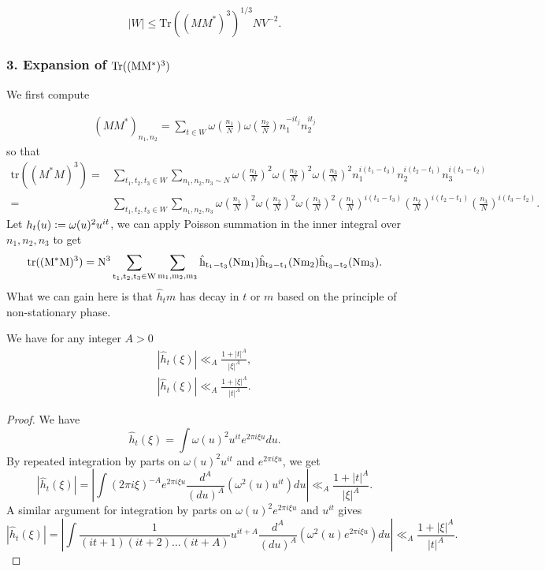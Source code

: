 \begin{equation}
    \label{traceineq}
    |W|\leq \textrm{Tr}((MM^*)^3)^{1/3} NV^{-2}.
\end{equation}

\subsubsection*{3. Expansion of $\rm{Tr}((MM^*)^3)$}
We first compute 

\begin{align*}
    (MM^*)_{n_1,n_2} = \sum_{t\in W} \omega\left(\frac{n_1}{N}\right)\omega\left(\frac{n_2}{N}\right)
    n_1^{-it_j}n_2^{it_j}
\end{align*}
so that\begin{align*}
    \textrm{tr}((M^*M)^3)=& \sum_{t_1,t_2,t_3\in W}\sum_{n_1,n_2,n_3\sim N} 
    \omega\left(\frac{n_1}{N}\right)^2\omega\left(\frac{n_2}{N}\right)^2\omega\left(\frac{n_3}{N}\right)^2 n_1^{i(t_1-t_3)}
   n_2^{i(t_2-t_1)}
    n_3^{i(t_3-t_2)}\\=& \sum_{t_1,t_2,t_3\in W}\sum_{n_1,n_2,n_3} 
    \omega\left(\frac{n_1}{N}\right)^2\omega\left(\frac{n_2}{N}\right)^2\omega\left(\frac{n_3}{N}\right)^2 \left(\frac{n_1}{N}\right)^{i(t_1-t_3)}
    \left(\frac{n_2}{N}\right)^{i(t_2-t_1)}
    \left(\frac{n_3}{N}\right)^{i(t_3-t_2)}.
\end{align*}
Let $h_t(u)\mathrel{\mathop:}= \omega(u)^2 u^{it}$, we can apply Poisson summation in the inner integral over $n_1,n_2,n_3$ to get 
\begin{equation}\label{poissongm}
    \rm{tr}((M^*M)^3)= N^3\sum_{t_1,t_2,t_3\in W}\sum_{m_1,m_2,m_3}  \hat{h}_{t_1-t_3}(Nm_1)\hat{h}_{t_2-t_1}(Nm_2)\hat{h}_{t_3-t_2}(Nm_3).
\end{equation}
What we can gain here is that $\hat{h}_t{m}$ has decay in $t$ or $m$ based on the principle of non-stationary phase. 
\begin{lemma}
    We have for any integer $A>0$\begin{align*}
        |\hat{h}_t(\xi)|\ll_A \frac{1+|t|^A}{|\xi|^A},\\
        |\hat{h}_t(\xi)|\ll_A \frac{1+|\xi|^A}{|t|^A}. 
    \end{align*}
\end{lemma}
\begin{proof}
   We have \[
   \hat{h}_t(\xi)=\int \omega(u)^2u^{it}e^{2\pi i \xi u} du.\]
   By repeated integration by parts on $\omega(u)^2u^{it}$ and $e^{2\pi i \xi u}$, we get \[
    |\hat{h}_t(\xi)|=\left|\int (2\pi i \xi)^{-A} e^{2\pi i \xi u}  \frac{d^A}{(du)^A}\left(\omega^2(u)u^{it}\right) du\right| \ll_A \frac{1+|t|^A}{|\xi|^A}.
   \]
   A similar argument for integration by parts on $\omega(u)^2e^{2\pi i \xi u}$ and $u^{it}$ gives \[
    |\hat{h}_t(\xi)|=\left|\int \frac{1}{(it+1)(it+2)\ldots(it+A)}u^{it+A}  \frac{d^A}{(du)^A}\left(\omega^2(u)e^{2\pi i \xi u}\right) du \right|\ll_A \frac{1+|\xi|^A}{|t|^A}.
   \]
\end{proof}
